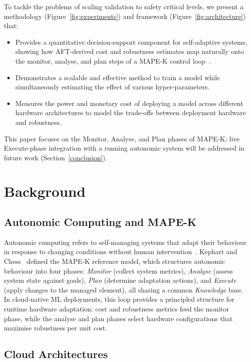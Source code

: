 \documentclass[conference]{IEEEtran}%
\begin{document}
To tackle the problems of scaling validation to safety critical levels, we present a methodology (Figure~\ref{fig:experiments}) and framework (Figure~\ref{fig:architecture}) that:
\begin{itemize}
    \item Provides a quantitative decision-support component for self-adaptive systems, showing how AFT-derived cost and robustness estimates map naturally onto the monitor, analyse, and plan steps of a MAPE-K control loop~\cite{kephart2003vision}.
    \item Demonstrates a scalable and effective method to train a model while simultaneously estimating the effect of various hyper-parameters.
    \item Measures the power and monetary cost of deploying a model across different hardware architectures to model the trade-offs between deployment hardware and robustness.
\end{itemize}
This paper focuses on the Monitor, Analyse, and Plan phases of MAPE-K\@; live Execute-phase integration with a running autonomic system will be addressed in future work (Section~\ref{conclusion}).


\section{Background}
\label{background}

\subsection{Autonomic Computing and MAPE-K}
\label{mapek}

Autonomic computing refers to self-managing systems that adapt their behaviour in response to changing conditions without human intervention~\cite{kephart2003vision}. Kephart and Chess~\cite{kephart2003vision} defined the MAPE-K reference model, which structures autonomic behaviour into four phases: \textit{Monitor} (collect system metrics), \textit{Analyse} (assess system state against goals), \textit{Plan} (determine adaptation actions), and \textit{Execute} (apply changes to the managed element), all sharing a common \textit{Knowledge} base. 
In cloud-native ML deployments, this loop provides a principled structure for runtime hardware adaptation: cost and robustness metrics feed the monitor phase, while the analyse and plan phases select hardware configurations that maximise robustness per unit cost.

\subsection{Cloud Architectures}
\end{document}
